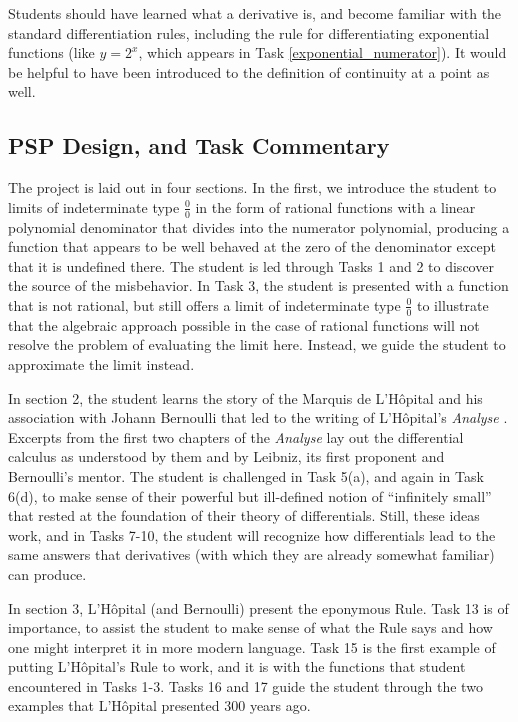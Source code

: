 \documentclass[11pt]{article}
\begin{document}
Students should have learned what a derivative is, and become familiar with the standard differentiation rules, including the rule for differentiating exponential functions (like $y=2^x$, which appears in Task \ref{exponential_numerator}). It would be helpful to have been introduced to the definition of continuity at a point as well. 

  \vspace*{-3pt}


  \vspace*{-6pt}
\subsection*{PSP Design, and Task Commentary}
  \vspace*{-3pt}
The project is laid out in four sections. In the first, we introduce the student to limits of indeterminate type $\frac00$ in the form of rational functions with a linear polynomial denominator that divides into the numerator polynomial, producing a function that appears to be well behaved at the zero of the denominator except that it is undefined there. The student is led through Tasks 1 and 2 to discover the source of the misbehavior. In Task 3, the student is presented with a function that is not rational, but still offers a limit of indeterminate type $\frac00$ to illustrate that the algebraic approach possible in the case of rational functions will not resolve the problem of evaluating the limit here. Instead, we guide the student to approximate the limit instead.

In section 2, the student learns the story of the Marquis de L'H\^opital and his association with Johann Bernoulli that led to the writing of L'H\^opital's \emph{Analyse} \citep{LHopital}. Excerpts from the first two chapters of the \emph{Analyse} lay out the differential calculus as understood by them and by Leibniz, its first proponent and Bernoulli's mentor. The student is challenged in Task 5(a), and again in Task 6(d), to make sense of their powerful but ill-defined notion of ``infinitely small'' that rested at the foundation of their theory of differentials. Still, these ideas work, and in Tasks 7-10, the student will recognize how differentials lead to the same answers that derivatives (with which they are already somewhat familiar) can produce.

In section 3, L'H\^opital (and Bernoulli) present the eponymous Rule. Task 13 is of importance, to assist the student to make sense of what the Rule says and how one might interpret it in more modern language. Task 15 is the first example of putting L'H\^opital's Rule to work, and it is with the functions that student encountered  in Tasks 1-3. Tasks 16 and 17 guide the student through the two examples that L'H\^opital presented 300 years ago.
\end{document}
